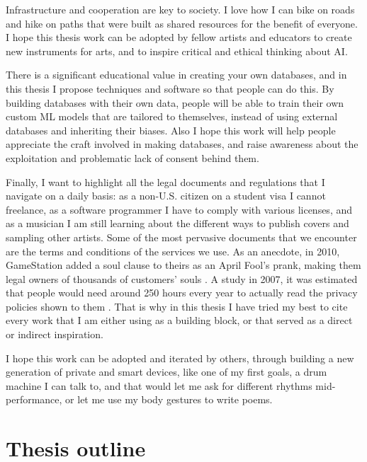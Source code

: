 Infrastructure and cooperation are key to society. I love how I can bike on roads and hike on paths that were built as shared resources for the benefit of everyone. I hope this thesis work can be adopted by fellow artists and educators to create new instruments for arts, and to inspire critical and ethical thinking about \acrshort{AI}.

There is a significant educational value in creating your own databases, and in this thesis I propose techniques and software so that people can do this. By building databases with their own data, people will be able to train their own custom \acrshort{ML} models that are tailored to themselves, instead of using external databases and inheriting their biases. Also I hope this work will help people appreciate the craft involved in making databases, and raise awareness about the exploitation and problematic lack of consent behind them.

Finally, I want to highlight all the legal documents and regulations that I navigate on a daily basis: as a non-U.S. citizen on a student visa I cannot freelance, as a software programmer I have to comply with various licenses, and as a musician I am still learning about the different ways to publish covers and sampling other artists. Some of the most pervasive documents that we encounter are the terms and conditions of the services we use. As an anecdote, in 2010, GameStation added a soul clause to theirs as an April Fool's prank, making them legal owners of thousands of customers' souls \cite{website-huffpost-gamestation-soul-clause}. A study in 2007, it was estimated that people would need around 250 hours every year to actually read the privacy policies shown to them \cite{article-cost-of-reading-privacy-policies}. That is why in this thesis I have tried my best to cite every work that I am either using as a building block, or that served as a direct or indirect inspiration.

I hope this work can be adopted and iterated by others, through building a new generation of private and smart devices, like one of my first goals, a drum machine I can talk to, and that would let me ask for different rhythms mid-performance, or let me use my body gestures to write poems.

\section{Thesis outline}

